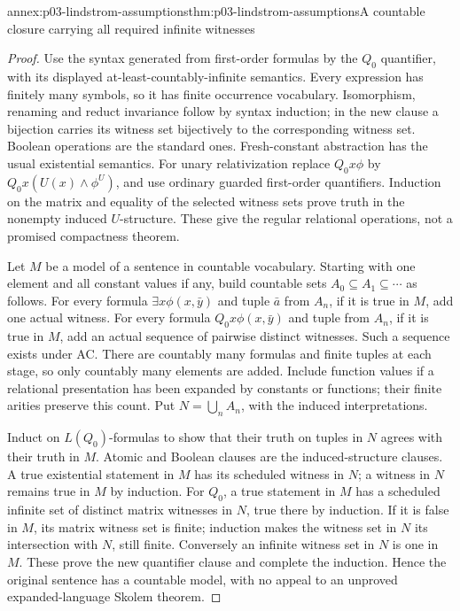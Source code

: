 \begin{annexitem}{annex:p03-lindstrom-assumptions}{thm:p03-lindstrom-assumptions}{A countable closure carrying all required infinite witnesses}
\begin{proof}
Use the syntax generated from first-order formulas by the \(Q_0\)
quantifier, with its displayed at-least-countably-infinite semantics.
Every expression has finitely many symbols, so it has finite occurrence
vocabulary. Isomorphism, renaming and reduct invariance follow by syntax
induction; in the new clause a bijection carries its witness set bijectively
to the corresponding witness set. Boolean operations are the standard
ones. Fresh-constant abstraction has the usual existential semantics.
For unary relativization replace \(Q_0x\phi\) by
\(Q_0x(U(x)\land\phi^U)\), and use ordinary guarded first-order
quantifiers. Induction on the matrix and equality of the selected witness
sets prove truth in the nonempty induced \(U\)-structure. These give
the regular relational operations, not a promised compactness theorem.

Let \(M\) be a model of a sentence in countable vocabulary. Starting
with one element and all constant values if any, build countable sets
\(A_0\subseteq A_1\subseteq\cdots\) as follows. For every formula
\(\exists x\phi(x,\bar y)\) and tuple \(\bar a\) from \(A_n\),
if it is true in \(M\), add one actual witness. For every formula
\(Q_0x\phi(x,\bar y)\) and tuple from \(A_n\), if it is true in
\(M\), add an actual sequence of pairwise distinct witnesses. Such a
sequence exists under AC. There are countably many formulas and finite
tuples at each stage, so only countably many elements are added. Include
function values if a relational presentation has been expanded by constants
or functions; their finite arities preserve this count. Put
\(N=\bigcup_nA_n\), with the induced interpretations.

Induct on \(L(Q_0)\)-formulas to show that their truth on tuples in
\(N\) agrees with their truth in \(M\). Atomic and Boolean clauses
are the induced-structure clauses. A true existential statement in \(M\)
has its scheduled witness in \(N\); a witness in \(N\) remains true
in \(M\) by induction. For \(Q_0\), a true statement in \(M\)
has a scheduled infinite set of distinct matrix witnesses in \(N\),
true there by induction. If it is false in \(M\), its matrix witness
set is finite; induction makes the witness set in \(N\) its intersection
with \(N\), still finite. Conversely an infinite witness set in
\(N\) is one in \(M\). These prove the new quantifier clause and
complete the induction. Hence the original sentence has a countable
model, with no appeal to an unproved expanded-language Skolem theorem.


\end{proof}
\end{annexitem}
